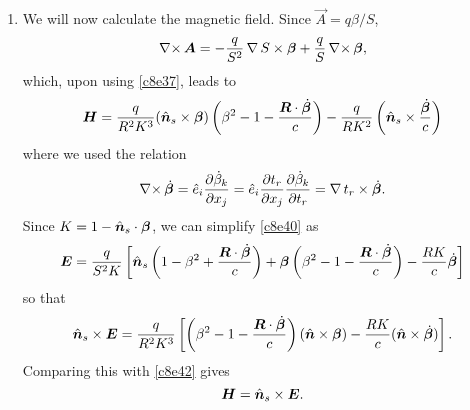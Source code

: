 \begin{enumerate}
\item We will now calculate the magnetic field. Since $\vec{A} = q\beta/S$,
\[
\operatorname{\nabla\times}\bm{A} = -\frac{q}{S^2}\operatorname{\nabla} S \times \bm{\beta} + 
\frac{q}{S}\operatorname{\nabla\times}\bm{\beta},
\]
which, upon using \eqref{c8e37}, leads to
\begin{equation}\label{c8e42}
\bm{H} = \frac{q}{R^2K^3}(\hat{\bm{n}}_s\times\bm{\beta})
\left(\beta^2 - 1 - \frac{\bm{R}\cdot\dot{\bm{\beta}}}{c}\right) -
\frac{q}{RK^2}\left(\hat{\bm{n}}_s \times \frac{\dot{\bm{\beta}}}{c}\right)
\end{equation}
where we used the relation
\[
\operatorname{\nabla\times}\dot{\bm{\beta}} = \hat{e}_i\frac{\partial{\dot{\beta}_k}}{\partial{x_j}} =
\hat{e}_i\frac{\partial{t_r}}{\partial{x_j}}\frac{\partial{\dot{\beta}_k}}{\partial{t_r}} = 
\operatorname{\nabla}{t_r}\times\dot{\bm{\beta}}.
\]
Since $K = 1 - \hat{\bm{n}}_s\cdot\bm{\beta}$, we can simplify \eqref{c8e40} as
\[
\bm{E} = \frac{q}{S^2K}\left[
\hat{\bm{n}}_s\left(1 - \beta^2 + \frac{\bm{R}\cdot\dot{\bm{\beta}}}{c}\right) +
\bm{\beta}\left(\beta^2 - 1 - \frac{\bm{R}\cdot\dot{\bm{\beta}}}{c}\right)- 
\frac{RK}{c}\dot{\bm{\beta}}\right]
\]
so that
\[
\hat{\bm{n}}_s \times \bm{E} = \frac{q}{R^2K^3}\left[
\left(\beta^2 - 1 - \frac{\bm{R}\cdot\dot{\bm{\beta}}}{c}\right)
(\hat{\bm{n}}\times\bm{\beta}) - \frac{RK}{c}(\hat{\bm{n}}\times\dot{\bm{\beta}})\right].
\]
Comparing this with \eqref{c8e42} gives
\begin{equation}\label{c8e43}
\bm{H} = \hat{\bm{n}}_s \times \bm{E}.
\end{equation}
\end{enumerate}
